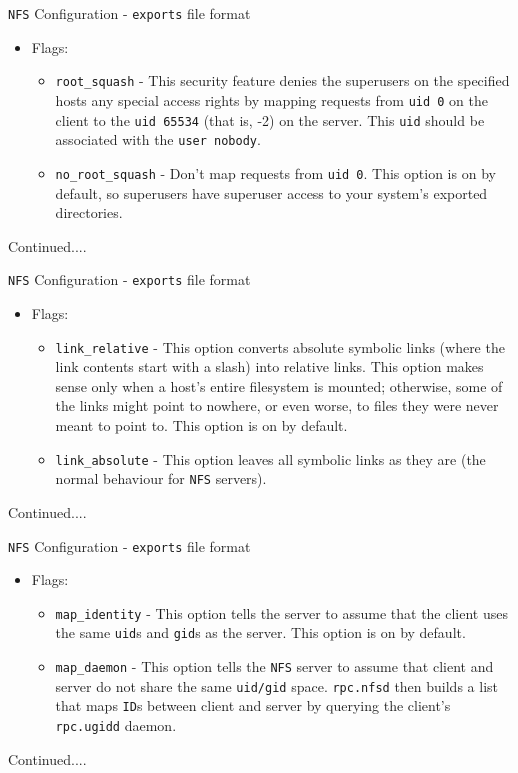 \documentclass[xcolor=table]{beamer}
\begin{document}
\begin{frame}{\texttt{NFS} Configuration - \texttt{exports} file format}
  \begin{itemize}
    \item Flags:
      \begin{itemize}
        \item \texttt{root\_squash} - This security feature denies the superusers on the specified hosts any special access rights by mapping requests from \texttt{uid 0} on the client to the \texttt{uid 65534} (that is, -2) on the server. This \texttt{uid} should be associated with the \texttt{user nobody}.
        \item \texttt{no\_root\_squash} - Don't map requests from \texttt{uid 0}. This option is on by default, so superusers have superuser access to your system's exported directories.
      \end{itemize}
  \end{itemize}
  Continued....
\end{frame}

\begin{frame}{\texttt{NFS} Configuration - \texttt{exports} file format}
  \begin{itemize}
    \item Flags:
      \begin{itemize}
        \item \texttt{link\_relative} - This option converts absolute symbolic links (where the link contents start with a slash) into relative links. This option makes sense only when a host's entire filesystem is mounted; otherwise, some of the links might point to nowhere, or even worse, to files they were never meant to point to. This option is on by default.
        \item \texttt{link\_absolute} - This option leaves all symbolic links as they are (the normal behaviour for \texttt{NFS} servers).
      \end{itemize}
  \end{itemize}
  Continued....
\end{frame}

\begin{frame}{\texttt{NFS} Configuration - \texttt{exports} file format}
  \begin{itemize}
    \item Flags:
      \begin{itemize}
        \item \texttt{map\_identity} - This option tells the server to assume that the client uses the same \texttt{uid}s and \texttt{gid}s as the server. This option is on by default.
        \item \texttt{map\_daemon} - This option tells the \texttt{NFS} server to assume that client and server do not share the same \texttt{uid/gid} space. \texttt{rpc.nfsd} then builds a list that maps \texttt{ID}s between client and server by querying the client's \texttt{rpc.ugidd} daemon.
      \end{itemize}
  \end{itemize}
  Continued....
\end{frame}
\end{document}
